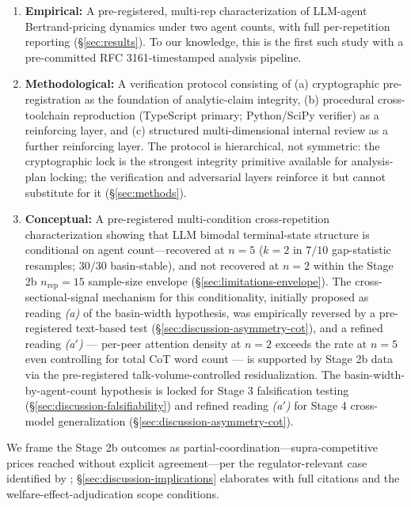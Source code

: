 \begin{enumerate}
    \item \textbf{Empirical:} A pre-registered, multi-rep characterization of LLM-agent
        Bertrand-pricing dynamics under two agent counts, with full per-repetition
        reporting (\S\ref{sec:results}). To our knowledge, this is the first such study
        with a pre-committed RFC 3161-timestamped analysis pipeline.

    \item \textbf{Methodological:} A verification protocol consisting of (a) cryptographic
        pre-registration as the foundation of analytic-claim integrity, (b) procedural
        cross-toolchain reproduction (TypeScript primary; Python/SciPy verifier) as a
        reinforcing layer, and (c) structured multi-dimensional internal review as a
        further reinforcing layer. The protocol is hierarchical, not symmetric: the
        cryptographic lock is the strongest integrity primitive available for analysis-plan
        locking; the verification and adversarial layers reinforce it but cannot substitute
        for it (\S\ref{sec:methods}).

    \item \textbf{Conceptual:} A pre-registered multi-condition cross-repetition
        characterization showing that LLM bimodal terminal-state structure
        \citep{Cao_2026_llm_collusion} is conditional on agent count---recovered at $n = 5$
        ($k = 2$ in $7/10$ gap-statistic resamples; $30/30$ basin-stable), and not
        recovered at $n = 2$ within the Stage 2b $n_{\text{rep}} = 15$ sample-size envelope
        (\S\ref{sec:limitations-envelope}). The cross-sectional-signal mechanism for this
        conditionality, initially proposed as reading \emph{(a)} of the basin-width
        hypothesis, was empirically reversed by a pre-registered text-based test
        (\S\ref{sec:discussion-asymmetry-cot}), and a refined reading \emph{(a$'$)} ---
        per-peer attention density at $n = 2$ exceeds the rate at $n = 5$ even controlling
        for total CoT word count --- is supported by Stage 2b data via the pre-registered
        talk-volume-controlled residualization. The basin-width-by-agent-count hypothesis is
        locked for Stage 3 falsification testing (\S\ref{sec:discussion-falsifiability})
        and refined reading \emph{(a$'$)} for Stage 4 cross-model generalization
        (\S\ref{sec:discussion-asymmetry-cot}).
\end{enumerate}

We frame the Stage 2b outcomes as partial-coordination---supra-competitive prices reached
without explicit agreement---per the regulator-relevant case identified by
\citet{ezrachi2016virtual,asker2021ai_pricing}; \S\ref{sec:discussion-implications}
elaborates with full citations and the welfare-effect-adjudication scope conditions.

